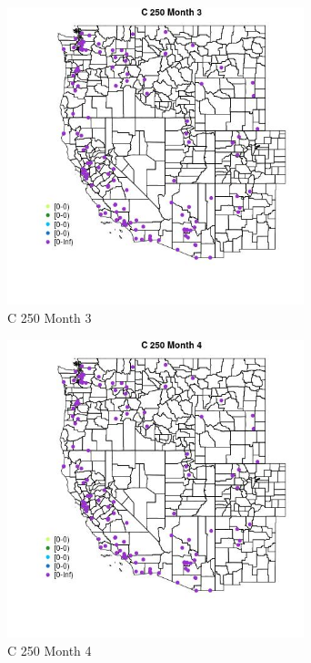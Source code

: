 \begin{figure} 
\centering  
\includegraphics[width=0.77\textwidth]{Code_Outputs/Report_ML_input_PM25_Step4_part_e_de_duplicated_aves_MapObsMo3C_250.jpg} 
\caption{\label{fig:Report_ML_input_PM25_Step4_part_e_de_duplicated_avesMapObsMo3C_250}C 250 Month 3} 
\end{figure} 
 

\begin{figure} 
\centering  
\includegraphics[width=0.77\textwidth]{Code_Outputs/Report_ML_input_PM25_Step4_part_e_de_duplicated_aves_MapObsMo4C_250.jpg} 
\caption{\label{fig:Report_ML_input_PM25_Step4_part_e_de_duplicated_avesMapObsMo4C_250}C 250 Month 4} 
\end{figure} 
 

